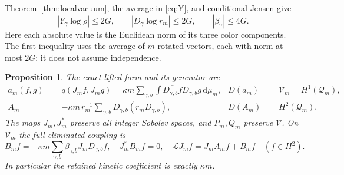 \documentclass[11pt]{article}
\newtheorem{proposition}[theorem]{Proposition}
\newcommand{\dd}{\,\mathrm d}
\newcommand{\LL}{\mathscr L}
\newcommand{\VV}{\mathscr V}
\begin{document}
Theorem~\ref{thm:localvacuum}, the average in \eqref{eq:Y}, and conditional
Jensen give
\begin{equation}\label{eq:coarsescorebound}
 |Y_\gamma\log\rho|\leq2G,\qquad
 |D_\gamma\log r_m|\leq2G,\qquad |\beta_\gamma|\leq4G.
\end{equation}
Here each absolute value is the Euclidean norm of its three color
components. The first inequality uses the average of $m$ rotated vectors,
each with norm at most $2G$; it does not assume independence.

\begin{proposition}\label{prop:forms}
The exact lifted form and its generator are
\begin{align}
 a_m(f,g)&=q(J_mf,J_mg)
    =\kappa m\sum_{\gamma,b}\int\overline{D_{\gamma,b}f}D_{\gamma,b}g\dd\mu_m,
       &D(a_m)&=\VV_m=H^1(\mathcal Q_m),\label{eq:am}\\
 A_m&=-\kappa m\,r_m^{-1}\sum_{\gamma,b}D_{\gamma,b}(r_mD_{\gamma,b}),
       &D(A_m)&=H^2(\mathcal Q_m).\label{eq:Am}
\end{align}
The maps $J_m,J_m^*$ preserve all integer Sobolev spaces, and $P_m,Q_m$
preserve $\VV$. On $\VV_m$ the full eliminated coupling is
\begin{equation}\label{eq:Bm}
 B_mf=-\kappa m\sum_{\gamma,b}\beta_{\gamma,b}J_mD_{\gamma,b}f,
 \quad J_m^*B_mf=0,\quad \LL J_mf=J_mA_mf+B_mf\quad(f\in H^2).
\end{equation}
In particular the retained kinetic coefficient is exactly $\kappa m$.
\end{proposition}
\end{document}
